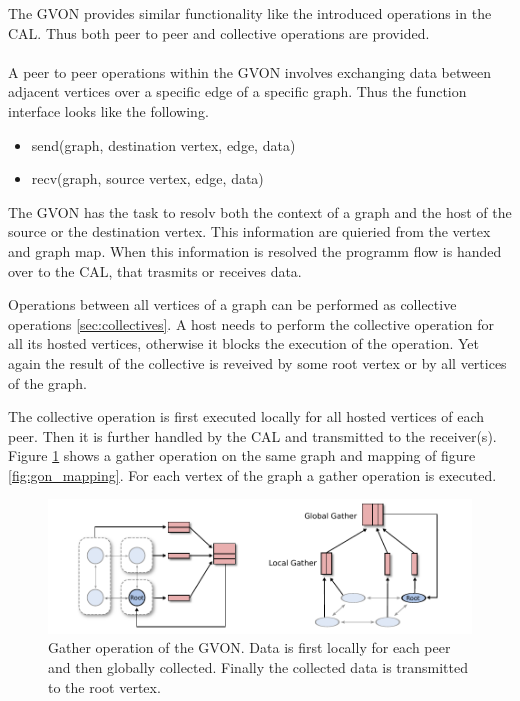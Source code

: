 The GVON provides similar functionality like the introduced operations
in the CAL. Thus both peer to peer and collective operations are
provided.


\paragraph*{}

A peer to peer operations within the GVON involves exchanging data
between adjacent vertices over a specific edge of a specific graph.
Thus the function interface looks like the following.

\begin{itemize}
  \item send(graph, destination vertex, edge, data)
  \item recv(graph, source vertex, edge, data)
\end{itemize}

The GVON has the task to resolv both the context of a graph and the
host of the source or the destination vertex. This information are
quieried from the vertex and graph map. When this information is
resolved the programm flow is handed over to the CAL, that trasmits or
receives data.

Operations between all vertices of a graph can be performed as
collective operations \ref{sec:collectives}. A host needs to
perform the collective operation for all its hosted vertices,
otherwise it blocks the execution of the operation. Yet again
the result of the collective is reveived by some root vertex
or by all vertices of the graph.

The collective operation is first executed locally for all hosted
vertices of each peer. Then it is further handled by the CAL and
transmitted to the receiver(s). Figure \ref{fig:gon_collective} shows
a gather operation on the same graph and mapping of figure
\ref{fig:gon_mapping}. For each vertex of the graph a gather operation
is executed.

\begin{figure}[H]
  \centering \includegraphics[width=\textwidth]{graphics/30_gon_collective}
  \caption{Gather operation of the GVON. Data is first locally for
    each peer and then globally collected. Finally the collected data
    is transmitted to the root vertex.}
  \label{fig:gon_collective}
\end{figure}

